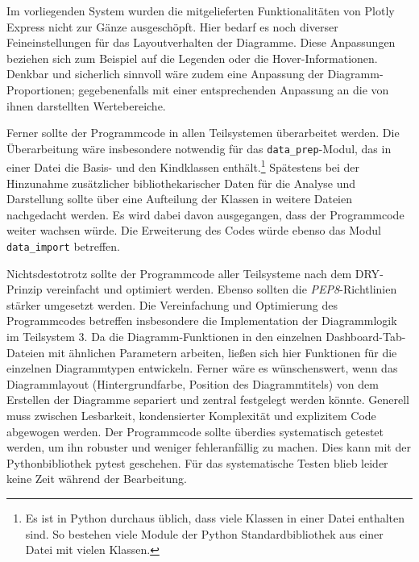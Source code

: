 Im vorliegenden System wurden die mitgelieferten Funktionalitäten von Plotly Express nicht zur Gänze ausgeschöpft. Hier bedarf es noch diverser Feineinstellungen für das Layoutverhalten der Diagramme.
Diese Anpassungen beziehen sich zum Beispiel auf die Legenden oder die Hover-Informationen.
Denkbar und sicherlich sinnvoll wäre zudem eine Anpassung der Diagramm-Proportionen; gegebenenfalls mit einer entsprechenden Anpassung an die von ihnen darstellten Wertebereiche. 


Ferner sollte der Programmcode in allen Teilsystemen überarbeitet werden. Die Überarbeitung wäre insbesondere notwendig für das \texttt{data\_prep}-Modul, 
das in einer Datei die Basis- und den Kindklassen enthält.\footnote{ Es ist in Python durchaus üblich, dass viele Klassen in einer Datei enthalten sind. 
So bestehen viele Module der Python Standardbibliothek aus einer Datei mit vielen Klassen.}
Spätestens bei der Hinzunahme zusätzlicher bibliothekarischer Daten für die Analyse und Darstellung sollte über eine Aufteilung der Klassen in weitere Dateien nachgedacht werden. 
Es wird dabei davon ausgegangen, dass der Programmcode weiter wachsen würde. Die Erweiterung des Codes würde ebenso das Modul \texttt{data\_import} betreffen. 

Nichtsdestotrotz sollte der Programmcode aller Teilsysteme nach dem \acrfull{DRY}-Prinzip vereinfacht und optimiert werden.
Ebenso sollten die \textit{\acrshort{PEP8}}-Richtlinien stärker umgesetzt werden.
Die Vereinfachung und Optimierung des Programmcodes betreffen insbesondere die Implementation der Diagrammlogik im Teilsystem 3. Da die Diagramm-Funktionen in den einzelnen Dashboard-Tab-Dateien mit ähnlichen Parametern arbeiten, 
ließen sich hier Funktionen für die einzelnen Diagrammtypen entwickeln. Ferner wäre es wünschenswert, wenn das Diagrammlayout (Hintergrundfarbe, Position des Diagrammtitels) 
von dem Erstellen der Diagramme separiert und zentral festgelegt werden könnte. 
Generell muss zwischen Lesbarkeit, kondensierter Komplexität und explizitem Code abgewogen werden. %
Der Programmcode sollte überdies systematisch getestet werden, um ihn robuster und weniger fehleranfällig zu machen. 
Dies kann mit der Pythonbibliothek pytest \cite[vgl.][]{krekel_pytest_2021} geschehen. Für das systematische Testen blieb leider keine Zeit während der Bearbeitung.


